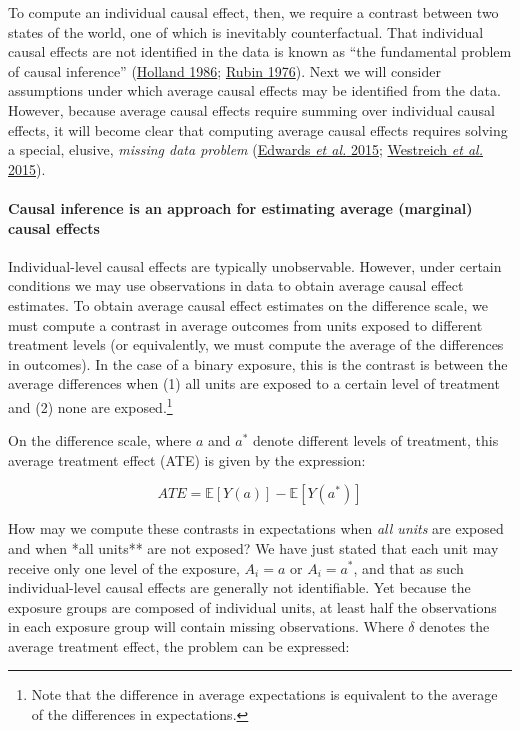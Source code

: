 \documentclass[
  singlecolumn]{article}
\let\oldparagraph\paragraph
\renewcommand{\paragraph}[1]{\oldparagraph{#1}\mbox{}}
\begin{document}
To compute an individual causal effect, then, we require a contrast
between two states of the world, one of which is inevitably
counterfactual. That individual causal effects are not identified in the
data is known as ``the fundamental problem of causal inference''
(\protect\hyperlink{ref-holland1986}{Holland 1986};
\protect\hyperlink{ref-rubin1976}{Rubin 1976}). Next we will consider
assumptions under which average causal effects may be identified from
the data. However, because average causal effects require summing over
individual causal effects, it will become clear that computing average
causal effects requires solving a special, elusive, \emph{missing data
problem} (\protect\hyperlink{ref-edwards2015}{Edwards \emph{et al.}
2015}; \protect\hyperlink{ref-westreich2015}{Westreich \emph{et al.}
2015}).

\hypertarget{causal-inference-is-an-approach-for-estimating-average-marginal-causal-effects}{%
\paragraph{Causal inference is an approach for estimating average
(marginal) causal
effects}\label{causal-inference-is-an-approach-for-estimating-average-marginal-causal-effects}}

Individual-level causal effects are typically unobservable. However,
under certain conditions we may use observations in data to obtain
average causal effect estimates. To obtain average causal effect
estimates on the difference scale, we must compute a contrast in average
outcomes from units exposed to different treatment levels (or
equivalently, we must compute the average of the differences in
outcomes). In the case of a binary exposure, this is the contrast is
between the average differences when (1) all units are exposed to a
certain level of treatment and (2) none are exposed.\footnote{Note that
  the difference in average expectations is equivalent to the average of
  the differences in expectations.}

On the difference scale, where \(a\) and \(a^*\) denote different levels
of treatment, this average treatment effect (ATE) is given by the
expression:

\[
ATE = \mathbb{E}[Y(a)] - \mathbb{E}[Y(a^*)]
\]

How may we compute these contrasts in expectations when \emph{all units}
are exposed and when *all units** are not exposed? We have just stated
that each unit may receive only one level of the exposure, \(A_i = a\)
or \(A_i = a^*\), and that as such individual-level causal effects are
generally not identifiable. Yet because the exposure groups are composed
of individual units, at least half the observations in each exposure
group will contain missing observations. Where \(\delta\) denotes the
average treatment effect, the problem can be expressed:
\end{document}
